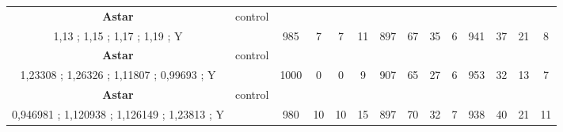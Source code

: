 \begin{table}[H]
{\begin{tabular}{|c|c|c|c|c|c|c|c|c|c|c|c|c|c|}
\cellcolor{blue!15}\textbf{Astar} & control& {\color[HTML]{00009B} } & {\color[HTML]{9A0000} } & {\color[HTML]{009901} } &  & {\color[HTML]{00009B} } & {\color[HTML]{9A0000} } & {\color[HTML]{009901} } &  & {\color[HTML]{00009B} } & {\color[HTML]{9A0000} } & {\color[HTML]{009901} } &  \\ 
\cellcolor{ blue!15}1,13 ; 1,15 ; 1,17 ; 1,19 ; Y &  & \multirow{-2}{*}{{\color[HTML]{00009B} 985}} & \multirow{-2}{*}{{\color[HTML]{9A0000} 7}} & \multirow{-2}{*}{{\color[HTML]{009901} 7}} & \multirow{-2}{*}{11} & \multirow{-2}{*}{{\color[HTML]{00009B} 897}} & \multirow{-2}{*}{{\color[HTML]{9A0000} 67}} & \multirow{-2}{*}{{\color[HTML]{009901} 35}} & \multirow{-2}{*}{6} & \multirow{-2}{*}{{\color[HTML]{00009B} 941}} & \multirow{-2}{*}{{\color[HTML]{9A0000} 37}} & \multirow{-2}{*}{{\color[HTML]{009901} 21}} & \multirow{-2}{*}{8} \\ \hline

\cellcolor{blue!15}\textbf{Astar} & control& {\color[HTML]{00009B} } & {\color[HTML]{9A0000} } & {\color[HTML]{009901} } &  & {\color[HTML]{00009B} } & {\color[HTML]{9A0000} } & {\color[HTML]{009901} } &  & {\color[HTML]{00009B} } & {\color[HTML]{9A0000} } & {\color[HTML]{009901} } &  \\ 
\cellcolor{ blue!15}1,23308 ; 1,26326 ; 1,11807 ; 0,99693 ; Y &  & \multirow{-2}{*}{{\color[HTML]{00009B} 1000}} & \multirow{-2}{*}{{\color[HTML]{9A0000} 0}} & \multirow{-2}{*}{{\color[HTML]{009901} 0}} & \multirow{-2}{*}{9} & \multirow{-2}{*}{{\color[HTML]{00009B} 907}} & \multirow{-2}{*}{{\color[HTML]{9A0000} 65}} & \multirow{-2}{*}{{\color[HTML]{009901} 27}} & \multirow{-2}{*}{6} & \multirow{-2}{*}{{\color[HTML]{00009B} 953}} & \multirow{-2}{*}{{\color[HTML]{9A0000} 32}} & \multirow{-2}{*}{{\color[HTML]{009901} 13}} & \multirow{-2}{*}{7} \\ \hline

\cellcolor{blue!15}\textbf{Astar} & control& {\color[HTML]{00009B} } & {\color[HTML]{9A0000} } & {\color[HTML]{009901} } &  & {\color[HTML]{00009B} } & {\color[HTML]{9A0000} } & {\color[HTML]{009901} } &  & {\color[HTML]{00009B} } & {\color[HTML]{9A0000} } & {\color[HTML]{009901} } &  \\ 
\cellcolor{ blue!15}0,946981 ; 1,120938 ; 1,126149 ; 1,23813 ; Y &  & \multirow{-2}{*}{{\color[HTML]{00009B} 980}} & \multirow{-2}{*}{{\color[HTML]{9A0000} 10}} & \multirow{-2}{*}{{\color[HTML]{009901} 10}} & \multirow{-2}{*}{15} & \multirow{-2}{*}{{\color[HTML]{00009B} 897}} & \multirow{-2}{*}{{\color[HTML]{9A0000} 70}} & \multirow{-2}{*}{{\color[HTML]{009901} 32}} & \multirow{-2}{*}{7} & \multirow{-2}{*}{{\color[HTML]{00009B} 938}} & \multirow{-2}{*}{{\color[HTML]{9A0000} 40}} & \multirow{-2}{*}{{\color[HTML]{009901} 21}} & \multirow{-2}{*}{11} \\ \hline


\end{tabular}}
\end{table}
